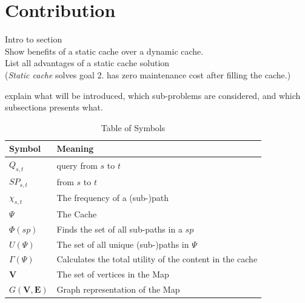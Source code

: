 





\section{Contribution} \label{sec:contribution}

Intro to section \\
Show benefits of a static cache over a dynamic cache.\\
List all advantages of a static cache solution \\
(\textit{Static cache} solves goal 2. has zero maintenance cost after filling the cache.)

explain what will be introduced, which sub-problems are considered, and which subsections presents what.


\begin{table}
\begin{tabular*}{\columnwidth}{|l|p{}|}
\hline
\bf Symbol		& \bf Meaning \\\hline
$Q_{s,t}$		& \spath query from $s$ to $t$ \\\hline
$SP_{s,t}$		& \spath from $s$ to $t$ \\\hline
$\chi_{s,t}$		& The frequency of a (sub-)path \\\hline
$\Psi$ 			& The Cache \\\hline
$\Phi(sp)$		& Finds the set of all sub-paths in a \spath $sp$ \\\hline
$U(\Psi)$		& The set of all unique (sub-)paths in $\Psi$ \\\hline
$\Gamma(\Psi)$		& Calculates the total utility of the content in the cache \\\hline 
$\mathbf{V}$ 		& The set of vertices in the Map \\\hline 
$G\mathbf{(V,E)}$ 	& Graph representation of the Map \\\hline 
\end{tabular*}
\caption{Table of Symbols}
\label{tab:symbols}
\end{table}


